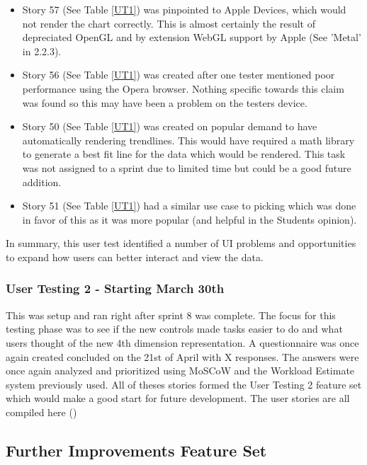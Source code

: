 \begin{itemize}
    \item Story 57 (See Table \ref{UT1}) was pinpointed to Apple Devices, which would not render the chart correctly. This is almost certainly the result of depreciated OpenGL and by extension WebGL support by Apple (See 'Metal' in 2.2.3).
    \item Story 56 (See Table \ref{UT1}) was created after one tester mentioned poor performance using the Opera browser. Nothing specific towards this claim was found so this may have been a problem on the testers device.
    \item Story 50 (See Table \ref{UT1}) was created on popular demand to have automatically rendering trendlines. This would have required a math library to generate a best fit line for the data which would be rendered. This task was not assigned to a sprint due to limited time but could be a good future addition.
    \item Story 51 (See Table \ref{UT1}) had a similar use case to picking which was done in favor of this as it was more popular (and helpful in the Students opinion).
\end{itemize}

In summary, this user test identified a number of UI problems and opportunities to expand how users can better interact and view the data.

\subsubsection{User Testing 2 - Starting March 30th}
This was setup and ran right after sprint 8 was complete. The focus for this testing phase was to see if the new controls made tasks easier to do and what users thought of the new 4th dimension representation. A questionnaire was once again created concluded on the 21st of April with X responses. The answers were once again analyzed and prioritized using
MoSCoW and the Workload Estimate system previously used. All of theses stories formed the User Testing 2 feature set which would make a good start for future development.
The user stories are all compiled here ()

\subsection{Further Improvements Feature Set}